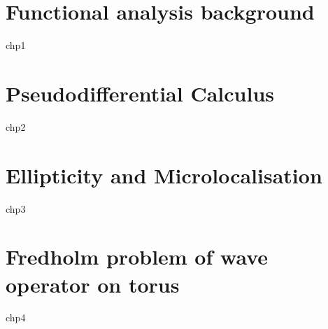 \documentclass[12pt, twoside]{book}
\begin{document}
\chapter{Functional analysis background}
{chp1}

\chapter{Pseudodifferential Calculus}
{chp2}

\chapter{Ellipticity and Microlocalisation}
{chp3}

\chapter[Fredholm problem of wave operator]{Fredholm problem of wave operator on torus}
{chp4}



\end{document}
